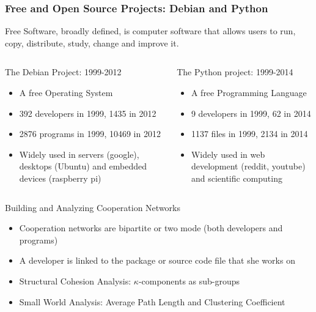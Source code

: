 \documentclass[ignorenonframetext,red,8pt]{beamer}
\begin{document}
\begin{frame}
\frametitle{Free and Open Source Projects: Debian and Python}

Free Software, broadly defined, is computer software that allows users to run, copy, distribute, study, change and improve it.

\begin{columns}[c]
\begin{column}{0.5\textwidth}
\begin{block}{The Debian Project: 1999-2012}
\begin{itemize}
\item A free Operating System
\item 392 developers in 1999, 1435 in 2012 
\item 2876 programs in 1999, 10469 in 2012
\item Widely used in servers (google), desktops (Ubuntu) and embedded devices (raspberry pi)
\end{itemize}
\end{block}
\end{column}

\begin{column}{0.5\textwidth}
\begin{block}{The Python project: 1999-2014}
\begin{itemize}
\item A free Programming Language
\item 9 developers in 1999, 62 in 2014
\item 1137 files in 1999, 2134 in 2014 
\item Widely used in web development (reddit, youtube) and scientific computing
\end{itemize}
\end{block}
\end{column}
\end{columns}

\begin{block}{Building and Analyzing Cooperation Networks}
\begin{itemize}
\item Cooperation networks are bipartite or two mode (both developers and programs)
\item A developer is linked to the package or source code file that she works on
\item Structural Cohesion Analysis: $\kappa$-components as sub-groups
\item Small World Analysis: Average Path Length and Clustering Coefficient 
\end{itemize}
\end{block}

\end{frame}
\end{document}
